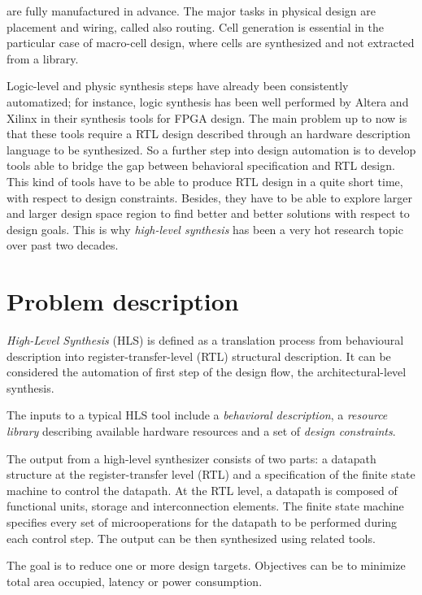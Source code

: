 are fully manufactured in advance. The major tasks in physical design are placement and wiring, called also routing. Cell generation is essential in the particular case of macro-\/cell design, where cells are synthesized and not extracted from a library.

Logic-\/level and physic synthesis steps have already been consistently automatized; for instance, logic synthesis has been well performed by Altera and Xilinx in their synthesis tools for F\+P\+GA design. The main problem up to now is that these tools require a R\+TL design described through an hardware description language to be synthesized. So a further step into design automation is to develop tools able to bridge the gap between behavioral specification and R\+TL design. This kind of tools have to be able to produce R\+TL design in a quite short time, with respect to design constraints. Besides, they have to be able to explore larger and larger design space region to find better and better solutions with respect to design goals. This is why {\itshape high-\/level synthesis} has been a very hot research topic over past two decades.\hypertarget{src_HLS_page_HLS_problem}{}\section{Problem description}\label{src_HLS_page_HLS_problem}
{\itshape High-\/\+Level Synthesis} (H\+LS) is defined as a translation process from behavioural description into register-\/transfer-\/level (R\+TL) structural description. It can be considered the automation of first step of the design flow, the architectural-\/level synthesis.

The inputs to a typical H\+LS tool include a {\itshape behavioral description}, a {\itshape resource library} describing available hardware resources and a set of {\itshape design constraints}.

The output from a high-\/level synthesizer consists of two parts\+: a datapath structure at the register-\/transfer level (R\+TL) and a specification of the finite state machine to control the datapath. At the R\+TL level, a datapath is composed of functional units, storage and interconnection elements. The finite state machine specifies every set of microoperations for the datapath to be performed during each control step. The output can be then synthesized using related tools.

The goal is to reduce one or more design targets. Objectives can be to minimize total area occupied, latency or power consumption.

